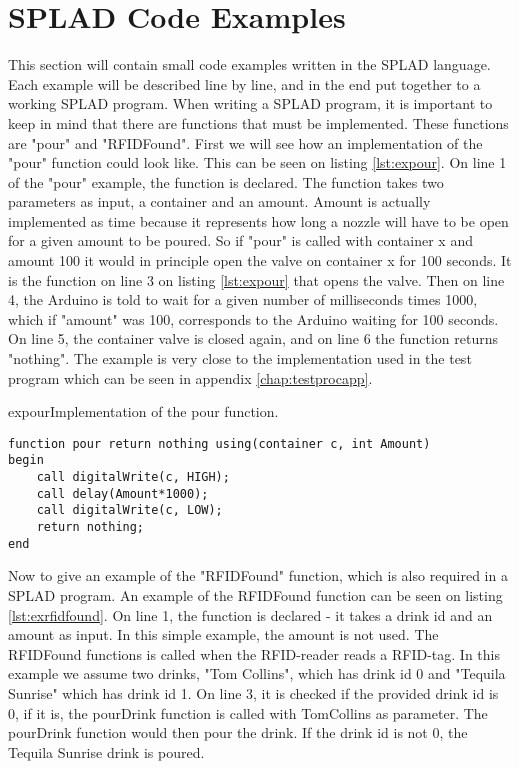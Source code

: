 \section{SPLAD Code Examples}
This section will contain small code examples written in the SPLAD language. Each example will be described line by line, and in the end put together to a working SPLAD program.
When writing a SPLAD program, it is important to keep in mind that there are functions that must be implemented. These functions are "pour" and "RFIDFound". First we will see how an implementation of the "pour" function could look like. This can be seen on listing \ref{lst:expour}. On line 1 of the "pour" example, the function is declared. The function takes two parameters as input, a container and an amount. Amount is actually implemented as time because it represents how long a nozzle will have to be open for a given amount to be poured. So if "pour" is called with container x and amount 100 it would in principle open the valve on container x for 100 seconds. It is the function on line 3 on listing \ref{lst:expour} that opens the valve. Then on line 4, the Arduino is told to wait for a given number of milliseconds times 1000, which if "amount" was 100, corresponds to the Arduino waiting for 100 seconds. On line 5, the container valve is closed again, and on line 6 the function returns "nothing". The example is very close to the implementation used in the test program which can be seen in appendix \ref{chap:testprocapp}.

\begin{code}{expour}{Implementation of the pour function.}
\begin{lstlisting}
function pour return nothing using(container c, int Amount)
begin
	call digitalWrite(c, HIGH);
	call delay(Amount*1000);
	call digitalWrite(c, LOW);
	return nothing;
end
\end{lstlisting}
\end{code}

Now to give an example of the "RFIDFound" function, which is also required in a SPLAD program. An example of the RFIDFound function can be seen on listing \ref{lst:exrfidfound}. On line 1, the function is declared - it takes a drink id and an amount as input. In this simple example, the amount is not used. The RFIDFound functions is called when the RFID-reader reads a RFID-tag. In this example we assume two drinks, "Tom Collins", which has drink id 0 and "Tequila Sunrise" which has drink id 1. On line 3, it is checked if the provided drink id is 0, if it is, the pourDrink function is called with TomCollins as parameter. The pourDrink function would then pour the drink. If the drink id is not 0, the Tequila Sunrise drink is poured.   

